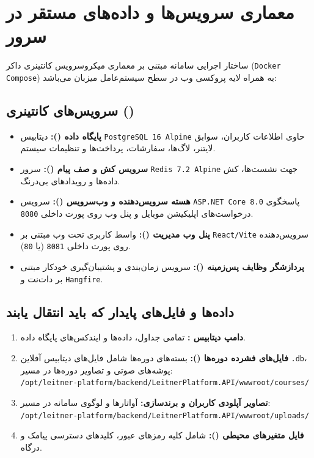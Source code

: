 \documentclass[11pt,a4paper]{article}
\begin{document}
\section{معماری سرویس‌ها و داده‌های مستقر در سرور}
ساختار اجرایی سامانه مبتنی بر معماری میکروسرویس کانتینری داکر (\verb|Docker Compose|) به همراه لایه پروکسی وب در سطح سیستم‌عامل میزبان می‌باشد:

\subsection{سرویس‌های کانتینری ()}
\begin{itemize}
    \item \textbf{پایگاه داده ():} دیتابیس \verb|PostgreSQL 16 Alpine| حاوی اطلاعات کاربران، سوابق لایتنر، لاگ‌ها، سفارشات، پرداخت‌ها و تنظیمات سیستم.
    \item \textbf{سرویس کش و صف پیام ():} سرور \verb|Redis 7.2 Alpine| جهت نشست‌ها، کش داده‌ها و رویدادهای بی‌درنگ.
    \item \textbf{هسته سرویس‌دهنده و وب‌سرویس ():} سرویس \verb|ASP.NET Core 8.0| پاسخگوی درخواست‌های اپلیکیشن موبایل و پنل وب روی پورت داخلی \verb|8080|.
    \item \textbf{پنل وب مدیریت ():} واسط کاربری تحت وب مبتنی بر \verb|React/Vite| سرویس‌دهنده روی پورت داخلی \verb|8081| (یا \verb|80|).
    \item \textbf{پردازشگر وظایف پس‌زمینه ():} سرویس زمان‌بندی و پشتیبان‌گیری خودکار مبتنی بر دات‌نت و \verb|Hangfire|.
\end{itemize}

\subsection{داده‌ها و فایل‌های پایدار که باید انتقال یابند}
\begin{enumerate}
    \item \textbf{دامپ دیتابیس :} تمامی جداول، داده‌ها و ایندکس‌های پایگاه داده.
    \item \textbf{فایل‌های فشرده دوره‌ها ():} بسته‌های دوره‌ها شامل فایل‌های دیتابیس آفلاین \verb|.db|، پوشه‌های صوتی و تصاویر دوره‌ها در مسیر:\\
    \verb|/opt/leitner-platform/backend/LeitnerPlatform.API/wwwroot/courses/|
    \item \textbf{تصاویر آپلودی کاربران و برندسازی:} آواتارها و لوگوی سامانه در مسیر:\\
    \verb|/opt/leitner-platform/backend/LeitnerPlatform.API/wwwroot/uploads/|
    \item \textbf{فایل متغیرهای محیطی ():} شامل کلیه رمزهای عبور، کلیدهای دسترسی پیامک و درگاه.
\end{enumerate}
\end{document}
